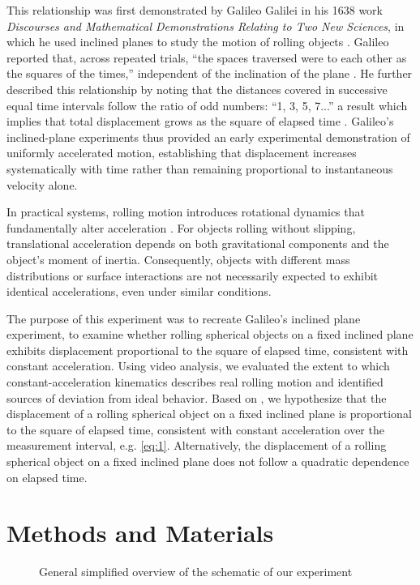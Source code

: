 \documentclass[reprint,amsmath,amssymb,aps,twoside]{revtex4-2}
\begin{document}
This relationship was first demonstrated by Galileo Galilei in his 1638 work \emph{Discourses and Mathematical Demonstrations Relating to Two New Sciences}, in which he used inclined planes to study the motion of rolling objects \cite{galilei:1638:discorsi, machamer:2021:galileo}. Galileo reported that, across repeated trials, ``the spaces traversed were to each other as the squares of the times,'' independent of the inclination of the plane \cite{galilei:1638:discorsi}. He further described this relationship by noting that the distances covered in successive equal time intervals follow the ratio of odd numbers: ``1, 3, 5, 7...'' a result which implies that total displacement grows as the square of elapsed time \cite{galilei:1638:discorsi}. Galileo’s inclined-plane experiments thus provided an early experimental demonstration of uniformly accelerated motion, establishing that displacement increases systematically with time rather than remaining proportional to instantaneous velocity alone.

In practical systems, rolling motion introduces rotational dynamics that fundamentally alter acceleration \cite{tipler, openstax, barrons}. For objects rolling without slipping, translational acceleration depends on both gravitational components and the object’s moment of inertia. Consequently, objects with different mass distributions or surface interactions are not necessarily expected to exhibit identical accelerations, even under similar conditions. 

The purpose of this experiment was to recreate Galileo's inclined plane experiment, to examine whether rolling spherical objects on a fixed inclined plane exhibits displacement proportional to the square of elapsed time, consistent with constant acceleration. Using video analysis, we evaluated the extent to which constant-acceleration kinematics describes real rolling motion and identified sources of deviation from ideal behavior.
Based on \cite{galilei:1638:discorsi}, we hypothesize that the displacement of a rolling spherical object on a fixed inclined plane is proportional to the square of elapsed time, consistent with constant acceleration over the measurement interval, e.g. \cref{eq:1}. Alternatively, 
the displacement of a rolling spherical object on a fixed inclined plane does not follow a quadratic dependence on elapsed time.





\section{Methods and Materials}
\begin{figure}
\begin{center}

\end{center}
\caption{General simplified overview of the schematic of our experiment}
\label{fig:1}
\end{figure}
\end{document}
